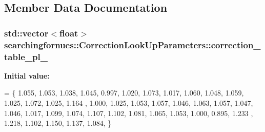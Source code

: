 \subsection{Member Data Documentation}
\subsubsection[{\texorpdfstring{correction\+\_\+table\+\_\+pl\+\_\+0}{correction_table_pl_0}}]{\setlength{\rightskip}{0pt plus 5cm}std\+::vector$<$float$>$ searchingfornues\+::\+Correction\+Look\+Up\+Parameters\+::correction\+\_\+table\+\_\+pl\+\_}\hypertarget{structsearchingfornues_1_1CorrectionLookUpParameters_a36b2ccdf7ed5b2d952dfdeee0ab201bc}{}\label{structsearchingfornues_1_1CorrectionLookUpParameters_a36b2ccdf7ed5b2d952dfdeee0ab201bc}
{\bfseries Initial value\+:}
\begin{DoxyCode}
= \{
    1.055, 1.053, 1.038, 1.045, 0.997, 1.020, 1.073, 1.017, 1.060, 1.048, 1.059, 1.025, 1.072, 1.025, 1.164
      , 1.000, 1.025, 1.053, 1.057, 1.046,
    1.063, 1.057, 1.047, 1.046, 1.017, 1.099, 1.074, 1.107, 1.102, 1.081, 1.065, 1.053, 1.000, 0.895, 1.233
      , 1.218, 1.102, 1.150, 1.137, 1.084,
    \}
\end{DoxyCode}
